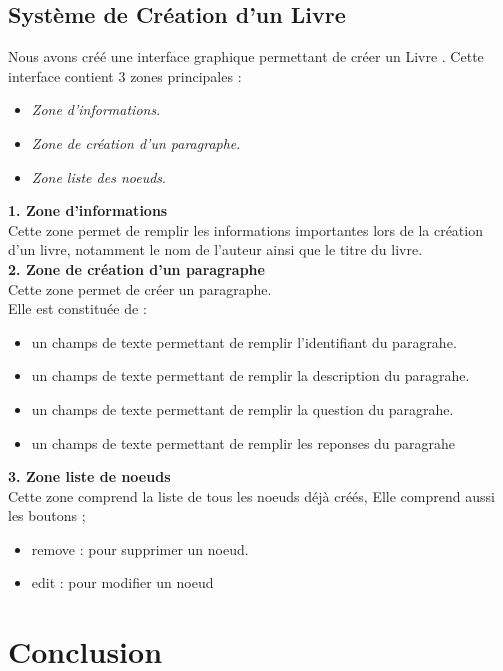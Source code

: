 \documentclass[12pt]{article}
\begin{document}
    \subsection{Système de Création d'un Livre}
    Nous avons créé une interface graphique permettant de créer un Livre  . Cette interface contient 3 zones principales :
    \begin{itemize}
		\item \textit{Zone d'informations}.
		\item \textit{Zone de création d'un paragraphe}.
		\item \textit{Zone liste des noeuds}.\\
	\end{itemize}
	 \textbf{1. Zone d'informations}\\
	 Cette zone permet de remplir les informations importantes lors de la création d'un livre, notamment le nom de l'auteur ainsi que le titre du livre.\\ \textbf{2. Zone de création d'un paragraphe}\\ Cette zone permet de créer un paragraphe.\\ Elle est constituée de :
	 \begin{itemize}
		\item {un champs de texte permettant de remplir l'identifiant du paragrahe}.
		\item {un champs de texte permettant de remplir la description du paragrahe}.
		\item {un champs de texte permettant de remplir la question du paragrahe}.
		\item {un champs de texte permettant de remplir les reponses du paragrahe}\\
	\end{itemize}
    \textbf{3. Zone liste de noeuds}\\	 
   Cette zone comprend la liste de tous les noeuds déjà créés, Elle comprend aussi les boutons ;
   \begin{itemize}
    \item {remove : pour supprimer un noeud}.
    \item {edit : pour modifier un noeud}
  \end{itemize} 
  \newpage
  \section{Conclusion}
\end{document}
